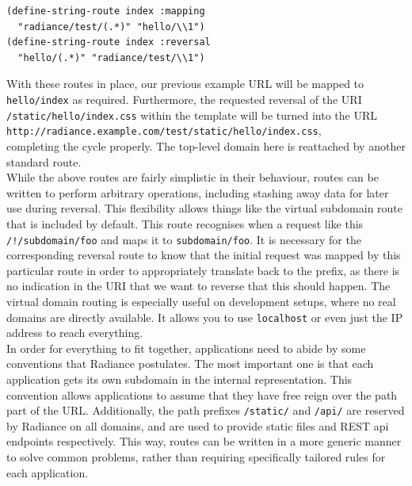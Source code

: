 \documentclass{sig-alternate}
\begin{document}
\begin{verbatim}
(define-string-route index :mapping 
  "radiance/test/(.*)" "hello/\\1")
(define-string-route index :reversal
  "hello/(.*)" "radiance/test/\\1")
\end{verbatim}

With these routes in place, our previous example URL will be mapped to \texttt{hello/index} as required. Furthermore, the requested reversal of the URI \texttt{/static/hello/index.css} within the template will be turned into the URL \\\texttt{\small http://radiance.example.com/test/static/hello/index.css},\\ completing the cycle properly. The top-level domain here is reattached by another standard route. \\

While the above routes are fairly simplistic in their behaviour, routes can be written to perform arbitrary operations, including stashing away data for later use during reversal. This flexibility allows things like the virtual subdomain route that is included by default. This route recognises when a request like this \texttt{/!/subdomain/foo} and maps it to \texttt{subdomain/foo}. It is necessary for the corresponding reversal route to know that the initial request was mapped by this particular route in order to appropriately translate back to the prefix, as there is no indication in the URI that we want to reverse that this should happen. The virtual domain routing is especially useful on development setups, where no real domains are directly available. It allows you to use \texttt{localhost} or even just the IP address to reach everything. \\

In order for everything to fit together, applications need to abide by some conventions that Radiance postulates. The most important one is that each application gets its own subdomain in the internal representation. This convention allows applications to assume that they have free reign over the path part of the URL. Additionally, the path prefixes \texttt{/static/} and \texttt{/api/} are reserved by Radiance on all domains, and are used to provide static files and REST api endpoints respectively. This way, routes can be written in a more generic manner to solve common problems, rather than requiring specifically tailored rules for each application. \\
\end{document}
